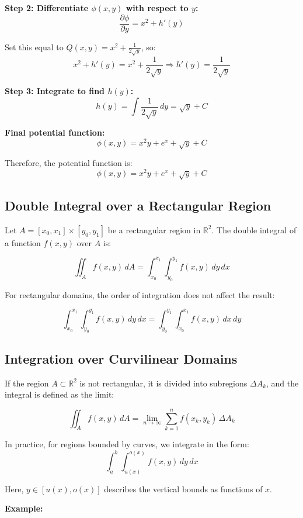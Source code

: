 \textbf{Step 2: Differentiate \( \phi(x, y) \) with respect to \( y \):}
\[
\frac{\partial \phi}{\partial y} = x^2 + h'(y)
\]

Set this equal to \( Q(x, y) = x^2 + \frac{1}{2\sqrt{y}} \), so:
\[
x^2 + h'(y) = x^2 + \frac{1}{2\sqrt{y}} \Rightarrow h'(y) = \frac{1}{2\sqrt{y}}
\]

\textbf{Step 3: Integrate to find \( h(y) \):}
\[
h(y) = \int \frac{1}{2\sqrt{y}}\,dy = \sqrt{y} + C
\]

\textbf{Final potential function:}
\[
\phi(x, y) = x^2y + e^x + \sqrt{y} + C
\]

Therefore, the potential function is:
\[
\boxed{\phi(x, y) = x^2y + e^x + \sqrt{y} + C}
\]


\subsection{Double Integral over a Rectangular Region}

Let \( A = [x_0, x_1] \times [y_0, y_1] \) be a rectangular region in \( \mathbb{R}^2 \). The double integral of a function \( f(x, y) \) over \( A \) is:

\[
\iint_A f(x, y)\, dA = \int_{x_0}^{x_1} \int_{y_0}^{y_1} f(x, y)\, dy\, dx
\]

For rectangular domains, the order of integration does not affect the result:

\[
\int_{x_0}^{x_1} \int_{y_0}^{y_1} f(x, y)\, dy\, dx = \int_{y_0}^{y_1} \int_{x_0}^{x_1} f(x, y)\, dx\, dy
\]


\subsection{Integration over Curvilinear Domains}

If the region \( A \subset \mathbb{R}^2 \) is not rectangular, it is divided into subregions \( \Delta A_k \), and the integral is defined as the limit:

\[
\iint_A f(x, y)\, dA = \lim_{n \to \infty} \sum_{k=1}^n f(x_k, y_k) \, \Delta A_k
\]

In practice, for regions bounded by curves, we integrate in the form:
\[
\int_a^b \int_{u(x)}^{o(x)} f(x, y)\, dy\, dx
\]

Here, \( y \in [u(x), o(x)] \) describes the vertical bounds as functions of \( x \).
\vspace{\baselineskip}

\textbf{Example:}
\vspace{\baselineskip}

